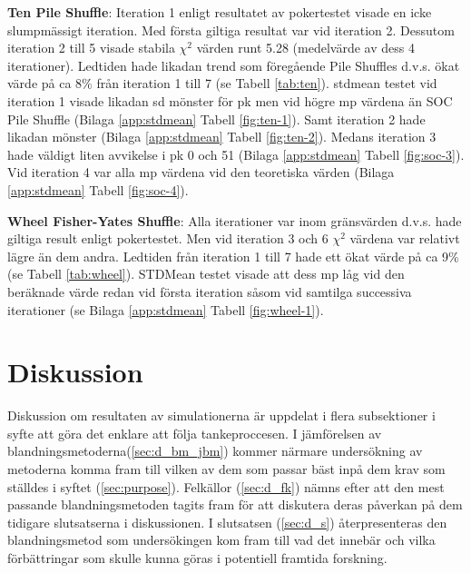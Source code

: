 \documentclass[swedish,a4paper]{article}
\begin{document}
\textbf{Ten Pile Shuffle}: Iteration 1 enligt resultatet av pokertestet visade
en icke slumpmässigt iteration. Med första giltiga resultat var vid iteration
2. Dessutom iteration 2 till 5 visade stabila $\chi^2$ värden runt 5.28
(medelvärde av dess 4 iterationer). Ledtiden hade likadan trend som föregående
Pile Shuffles d.v.s. ökat värde på ca 8\% från iteration 1 till 7 (se Tabell
\ref{tab:ten}). \gls{stdmean} testet vid iteration 1 visade likadan \gls{sd}
mönster för \gls{pk} men vid högre \gls{mp} värdena än SOC Pile Shuffle (Bilaga
\ref{app:stdmean} Tabell \ref{fig:ten-1}). Samt iteration 2 hade likadan mönster
(Bilaga \ref{app:stdmean} Tabell \ref{fig:ten-2}). Medans iteration 3 hade
väldigt liten avvikelse i \gls{pk} 0 och 51 (Bilaga \ref{app:stdmean} Tabell
\ref{fig:soc-3}). Vid iteration 4 var alla \gls{mp} värdena vid den teoretiska
värden (Bilaga \ref{app:stdmean} Tabell \ref{fig:soc-4}).


\textbf{Wheel Fisher-Yates Shuffle}: Alla iterationer var inom gränsvärden d.v.s.
hade giltiga result enligt pokertestet. Men vid iteration 3 och 6 $\chi^2$
värdena var relativt lägre än dem andra. Ledtiden från iteration 1 till 7 hade
ett ökat värde på ca 9\% (se Tabell \ref{tab:wheel}). STDMean testet visade att
dess \gls{mp} låg vid den beräknade värde redan vid första iteration såsom vid
samtilga successiva iterationer (se Bilaga \ref{app:stdmean} Tabell
\ref{fig:wheel-1}). 



\section{Diskussion}
Diskussion om resultaten av simulationerna är uppdelat i flera subsektioner i
syfte att göra det enklare att följa tankeproccesen.
I jämförelsen av
blandningsmetoderna(\ref{sec:d_bm_jbm}) kommer närmare undersökning av metoderna
komma fram till vilken av dem som passar bäst inpå dem krav som ställdes i
syftet (\ref{sec:purpose}). Felkällor (\ref{sec:d_fk}) nämns efter att den mest
passande blandningsmetoden tagits fram för att diskutera deras påverkan på dem
tidigare slutsatserna i diskussionen. I slutsatsen (\ref{sec:d_s})
återpresenteras den blandningsmetod som undersökingen kom fram till vad det
innebär och vilka förbättringar som skulle kunna göras i potentiell framtida
forskning.
\end{document}
